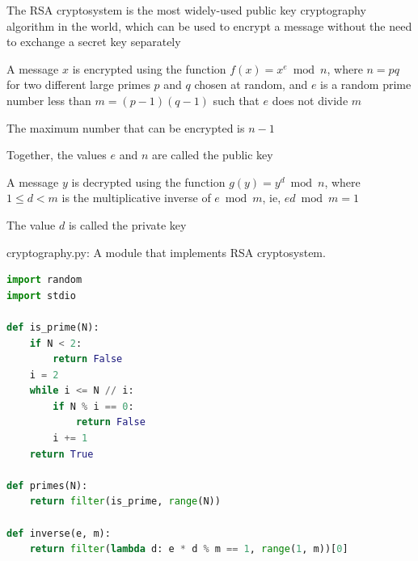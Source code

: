 \documentclass[8pt,a4paper,compress]{beamer}
\begin{document}
\begin{frame}[fragile]
\pause

The RSA cryptosystem is the most widely-used public key cryptography algorithm in the world, which can be used to encrypt a message without the need to exchange a secret key separately

\pause
\bigskip

A message $x$ is encrypted using the function $f(x) = x^e \bmod n$, where $n=pq$ for two different large primes $p$ and $q$ chosen at random, and $e$ is a random prime number less than $m=(p-1)(q-1)$ such that $e$ does not divide $m$

\pause
\bigskip

The maximum number that can be encrypted is $n-1$

\pause
\bigskip

Together, the values $e$ and $n$ are called the public key

\pause
\bigskip

A message $y$ is decrypted using the function $g(y) = y^d \bmod n$, where $1 \leq d < m$ is the multiplicative inverse of $e \bmod m$, ie, $ed \bmod m = 1$

\pause
\bigskip

The value $d$ is called the private key
\end{frame}

\begin{frame}[fragile]
\pause

\begin{framed}
\tiny cryptography.py: A module that implements RSA cryptosystem.
\end{framed}

\begin{lstlisting}[language=Python,style=focusin]
import random
import stdio

def is_prime(N):
    if N < 2: 
        return False
    i = 2
    while i <= N // i:
        if N % i == 0:
            return False
        i += 1
    return True

def primes(N):
    return filter(is_prime, range(N))

def inverse(e, m):
    return filter(lambda d: e * d % m == 1, range(1, m))[0]

\end{lstlisting}
\end{frame}
\end{document}

